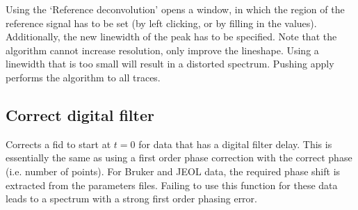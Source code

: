 \documentclass[11pt,a4paper]{article}
\begin{document}

Using the `Reference deconvolution' opens a window, in which the region of the reference signal has to be set (by left clicking, or by filling in the values). Additionally, the new linewidth of the peak has to be specified. Note that the algorithm cannot increase resolution, only improve the lineshape. Using a linewidth that is too small will result in a distorted spectrum. Pushing apply performs the algorithm to all traces.

\subsection{Correct digital filter}
Corrects a fid to start at $t=0$ for data that has a digital filter delay. This is essentially the
same as using a first order phase correction with the correct phase (i.e. number of points). For
Bruker and JEOL data, the required phase shift is extracted from the parameters files. Failing to
use this function for these data leads to a spectrum with a strong first order phasing error.

\end{document}
